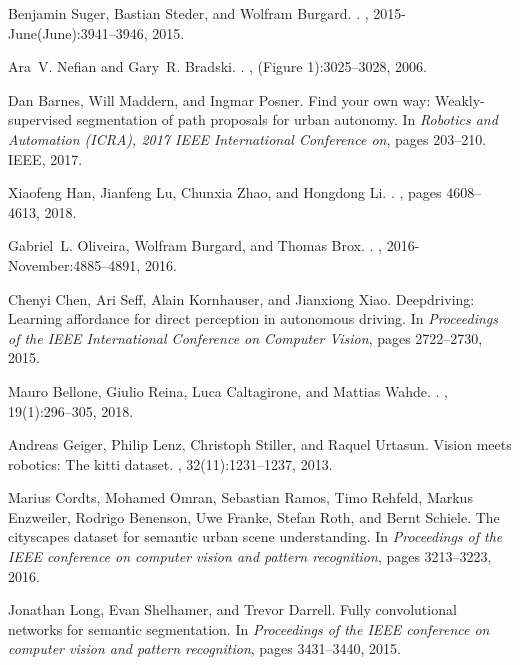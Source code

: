\documentclass[letterpaper, 10 pt, conference]{ieeeconf}  %
\begin{document}
\begin{thebibliography}{99}
	Benjamin Suger, Bastian Steder, and Wolfram Burgard.
	.
	, 2015-June(June):3941--3946, 2015.
	
	Ara~V. Nefian and Gary~R. Bradski.
	.
	, (Figure 1):3025--3028, 2006.
	
	Dan Barnes, Will Maddern, and Ingmar Posner.
	\newblock Find your own way: Weakly-supervised segmentation of path proposals
	for urban autonomy.
	\newblock In {\em Robotics and Automation (ICRA), 2017 IEEE International
		Conference on}, pages 203--210. IEEE, 2017.
	
	Xiaofeng Han, Jianfeng Lu, Chunxia Zhao, and Hongdong Li.
	.
	, pages 4608--4613, 2018.
	
	Gabriel~L. Oliveira, Wolfram Burgard, and Thomas Brox.
	.
	, 2016-November:4885--4891, 2016.
	
	Chenyi Chen, Ari Seff, Alain Kornhauser, and Jianxiong Xiao.
	\newblock Deepdriving: Learning affordance for direct perception in autonomous
	driving.
	\newblock In {\em Proceedings of the IEEE International Conference on Computer
		Vision}, pages 2722--2730, 2015.
	
	Mauro Bellone, Giulio Reina, Luca Caltagirone, and Mattias Wahde.
	.
	,
	19(1):296--305, 2018.
	
	Andreas Geiger, Philip Lenz, Christoph Stiller, and Raquel Urtasun.
	\newblock Vision meets robotics: The kitti dataset.
	,
	32(11):1231--1237, 2013.
	
	Marius Cordts, Mohamed Omran, Sebastian Ramos, Timo Rehfeld, Markus Enzweiler,
	Rodrigo Benenson, Uwe Franke, Stefan Roth, and Bernt Schiele.
	\newblock The cityscapes dataset for semantic urban scene understanding.
	\newblock In {\em Proceedings of the IEEE conference on computer vision and
		pattern recognition}, pages 3213--3223, 2016.
	
	Jonathan Long, Evan Shelhamer, and Trevor Darrell.
	\newblock Fully convolutional networks for semantic segmentation.
	\newblock In {\em Proceedings of the IEEE conference on computer vision and
		pattern recognition}, pages 3431--3440, 2015.
	
\end{thebibliography}
\end{document}
